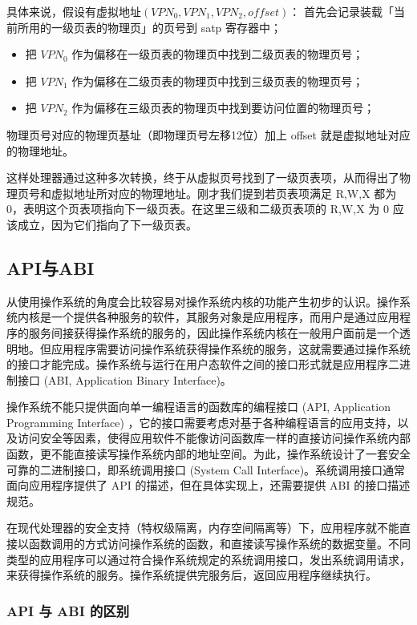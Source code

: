 具体来说，假设有虚拟地址$(VPN_{0} ,VPN_{1},VPN_{2},offset)$：
	首先会记录装载「当前所用的一级页表的物理页」的页号到 satp 寄存器中；
    \begin{itemize}
	\item 把 $VPN_{0}$ 作为偏移在一级页表的物理页中找到二级页表的物理页号；
	\item 把 $VPN_{1}$ 作为偏移在二级页表的物理页中找到三级页表的物理页号；
	\item 把 $VPN_{2}$ 作为偏移在三级页表的物理页中找到要访问位置的物理页号；
    \end{itemize}

	物理页号对应的物理页基址（即物理页号左移12位）加上 offset 就是虚拟地址对应的物理地址。

这样处理器通过这种多次转换，终于从虚拟页号找到了一级页表项，从而得出了物理页号和虚拟地址所对应的物理地址。刚才我们提到若页表项满足 R,W,X 都为 0，表明这个页表项指向下一级页表。在这里三级和二级页表项的 R,W,X 为 0 应该成立，因为它们指向了下一级页表。


\subsection{API与ABI}

从使用操作系统的角度会比较容易对操作系统内核的功能产生初步的认识。操作系统内核是一个提供各种服务的软件，其服务对象是应用程序，而用户是通过应用程序的服务间接获得操作系统的服务的，因此操作系统内核在一般用户面前是一个透明地。但应用程序需要访问操作系统获得操作系统的服务，这就需要通过操作系统的接口才能完成。操作系统与运行在用户态软件之间的接口形式就是应用程序二进制接口 (ABI, Application Binary Interface)。

操作系统不能只提供面向单一编程语言的函数库的编程接口 (API, Application Programming Interface) ，它的接口需要考虑对基于各种编程语言的应用支持，以及访问安全等因素，使得应用软件不能像访问函数库一样的直接访问操作系统内部函数，更不能直接读写操作系统内部的地址空间。为此，操作系统设计了一套安全可靠的二进制接口，即系统调用接口 (System Call Interface)。系统调用接口通常面向应用程序提供了 API 的描述，但在具体实现上，还需要提供 ABI 的接口描述规范。

在现代处理器的安全支持（特权级隔离，内存空间隔离等）下，应用程序就不能直接以函数调用的方式访问操作系统的函数，和直接读写操作系统的数据变量。不同类型的应用程序可以通过符合操作系统规定的系统调用接口，发出系统调用请求，来获得操作系统的服务。操作系统提供完服务后，返回应用程序继续执行。

\subsubsection{API 与 ABI 的区别}


